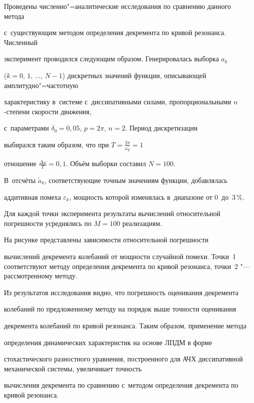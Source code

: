 Проведены численно"=аналитические исследования по сравнению данного метода 


с~существующим методом определения декремента по кривой резонанса. Численный 


эксперимент проводился следующим образом. Генерировалась выборка $a_k$  


($k = 0,\, 1,\, \dots,\,N - 1$) дискретных значений функции, описывающей амплитудно"=частотную 


характеристику в~системе с~диссипативными силами, пропорциональными $n$-степени скорости движения, 


с~параметрами $\delta _0 = 0{,}05$, $p = 2\pi $, $n = 2$. Период дискретизации 


выбирался таким образом, что при $T = \frac{2\pi }{\omega _p } = 1$ 


отношение $\frac{\Delta \omega }{T} = 0{,}1$. Объём выборки составил $N =100$. 


В~отсчёты $\tilde {a}_k $, соответствующие точным значениям функции, добавлялась 


аддитивная помеха $\varepsilon _k$, мощность которой изменялась  в~диапазоне от 0~до~3\,{\%}. 


Для каждой точки эксперимента результаты вычислений относительной погрешности усреднялись по $M = 100$ реализациям.





На рисунке представлены зависимости относительной погрешности 


вычислений декремента колебаний от мощности случайной помехи. Точки~1 соответствуют методу определения декремента по кривой резонанса, точки~2 "--- рассмотренному методу.





Из результатов исследования видно, что погрешность оценивания декремента 


колебаний по предложенному методу на порядок выше точности оценивания 


декремента колебаний по кривой резонанса. Таким образом, применение метода 


определения динамических характеристик на основе ЛПДМ в форме 


стохастического разностного уравнения, построенного для АЧХ диссипативной механической системы, увеличивает точность 


вычисления декремента по сравнению с~методом определения декремента по кривой резонанса.






